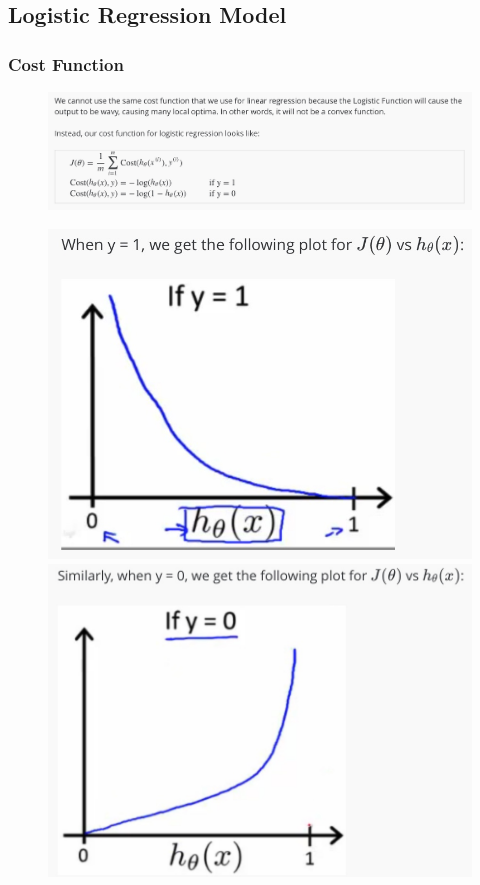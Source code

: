 \documentclass[12pt, A4,onecolumn]{article} %
\begin{document}
\newpage

\subsection{Logistic Regression Model}
\subsubsection{Cost Function}

\begin{figure}[H]
	\centering
	\includegraphics[width=1\textwidth]{./Imagenes/costFunc1}
\end{figure}


\begin{figure}[H]
  \includegraphics[width=\linewidth]{./Imagenes/costFunc2}
\endminipage\hfill
{}
  \includegraphics[width=\linewidth]{./Imagenes/costFunc3}
\endminipage\hfill
\end{figure}
\end{document}
